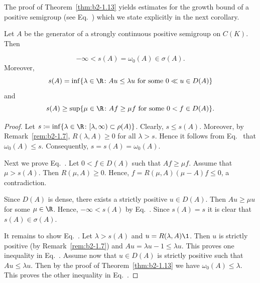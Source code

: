 The proof of Theorem~\ref{thm:b2-1.13} yields estimates for the growth bound of a positive semigroup (see Eq.~) which we state explicitly in the next corollary.

\begin{corollary}\label{cor:b2-1.14}
Let $A$ be the generator of a strongly continuous positive semigroup on $C(K)$.
Then

\begin{equation}\label{eq:b2-1.7}
-\infty < s(A) = \omega_{0}(A) \in \sigma(A).
\end{equation}
Moreover,
\begin{equation}\label{eq:b2-1.8}
s(A) = \inf\{\lambda \in \R \colon Au \leq \lambda u \text{ for some } 0 \ll u \in D(A)\}
\end{equation}
and
\begin{equation}\label{eq:b2-1.9}
s(A) \geq \sup\{\mu \in \R \colon Af \geq \mu f \text{ for some } 0 < f \in D(A)\}.
\end{equation}
\end{corollary}

\begin{proof}
Let $s \coloneqq \inf\{\lambda \in \R \colon [\lambda,\infty) \subset \rho(A)\}$.
Clearly, $s \leq s(A)$.
Moreover, by Remark~\ref{rem:b2-1.7}, $R(\lambda,A) \geq 0$ for all $\lambda > s$.
Hence it follows from Eq.~ that $\omega_{0}(A) \leq s$.
Consequently, $s = s(A) = \omega_{0}(A)$.

Next we prove Eq.~.
Let $0 < f \in D(A)$ such that $Af \geq \mu f$.
Assume that $\mu > s(A)$.
Then $R(\mu,A) \geq 0$.
Hence, $f = R(\mu,A)(\mu-A)f \leq 0$, a contradiction.

Since $D(A)$ is dense, there exists a strictly positive $u \in D(A)$.
Then $Au \geq \mu u$ for some $\mu \in \R$.
Hence, $-\infty < s(A)$ by Eq.~. 
Since $s(A) = s$ it is clear that $s(A) \in \sigma(A)$.

It remains to show Eq.~. 
Let $\lambda > s(A)$ and $u = R(\lambda,A)\1$.
Then $u$ is strictly positive (by  Remark~\ref{rem:b2-1.7}) and $Au = \lambda u - 1 \leq \lambda u$.
This proves one inequality in Eq.~. 
Assume now that $u \in D(A)$ is strictly positive such that $Au \leq \lambda u$.
Then by the proof of Theorem~\ref{thm:b2-1.13} we have $\omega_{0}(A) \leq \lambda$.
This proves the other inequality in Eq.~. 
\end{proof}

